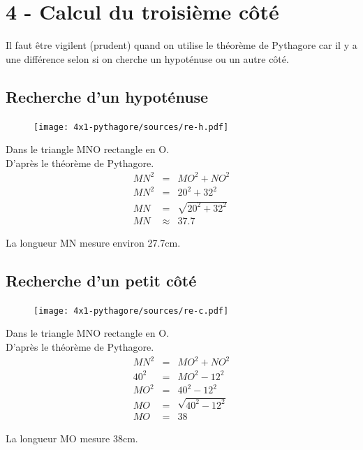 \documentclass[12pt]{article}
\begin{document}
\newpage
\section*{4 - Calcul du troisième côté}

Il faut être vigilent (prudent) quand on utilise le théorème de Pythagore car il y a une différence selon si on cherche un hypoténuse ou un autre côté.

\begin{multicols}{2}

	\subsection*{Recherche d'un hypoténuse}

	\begin{figure}[H]
		\centering
		\texttt{[image: 4x1-pythagore/sources/re-h.pdf]}
	\end{figure}

	Dans le triangle MNO rectangle en O.\\
	D'après le théorème de Pythagore.
	\begin{eqnarray*}
		MN^2 &=& MO^2 + NO^2 \\
		MN^2 &=& 20^2 + 32^2 \\
		MN   &=& \sqrt{20^2 + 32^2} \\
		MN   &\approx& 37.7
	\end{eqnarray*}

	La longueur MN mesure environ 27.7cm.


\end{multicols}
\begin{multicols}{2}
	\subsection*{Recherche d'un petit côté}

	\begin{figure}[H]
		\centering
		\texttt{[image: 4x1-pythagore/sources/re-c.pdf]}
	\end{figure}

	Dans le triangle MNO rectangle en O.\\
	D'après le théorème de Pythagore.
	\begin{eqnarray*}
		MN^2 &=& MO^2 + NO^2 \\
		40^2 &=& MO^2 - 12^2 \\
		MO^2 &=& 40^2 - 12^2 \\
		MO   &=& \sqrt{40^2 - 12^2} \\
		MO   &=& 38
	\end{eqnarray*}

	La longueur MO mesure 38cm.

\end{multicols}
\end{document}
